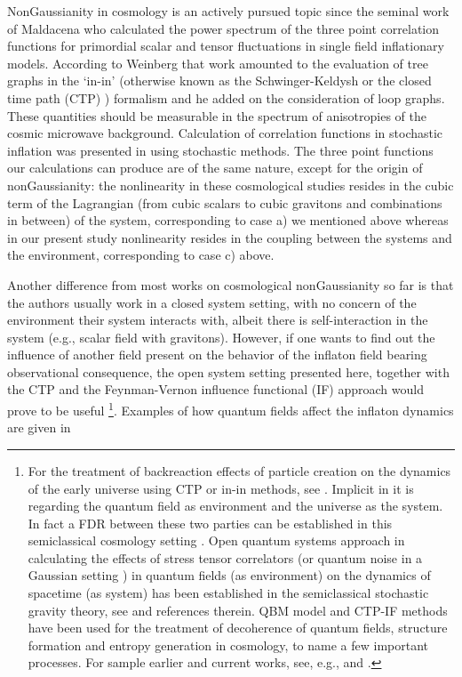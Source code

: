 \documentclass[%
amssymb,preprint,preprintnumbers,nofootinbib,superscriptaddress]{revtex4}
\begin{document}
NonGaussianity in cosmology is an actively pursued topic since the seminal work of Maldacena \cite{Maldacena} who calculated the power spectrum of the three point correlation functions for primordial scalar and tensor fluctuations in single field inflationary models.  According to Weinberg \cite{Weinberg} that work amounted to the evaluation of tree graphs in the `in-in' (otherwise known as the Schwinger-Keldysh   or the closed time path (CTP) \cite{ctp}) formalism and he added on the consideration of loop graphs. These quantities should be  measurable in the spectrum of anisotropies of the cosmic microwave background. Calculation of correlation functions in stochastic inflation was presented in \cite{VenSta} using stochastic methods.  The three point functions our calculations can produce are of the same nature, except for the origin of nonGaussianity: the nonlinearity in these cosmological studies resides in the cubic term of the Lagrangian (from cubic scalars to cubic gravitons and combinations in between) of the system, corresponding to case a) we mentioned above whereas in our present study nonlinearity resides in the coupling between the systems and the environment, corresponding to case c) above.


Another difference from most works on   cosmological nonGaussianity so far is that the authors usually work in a closed system setting, with no concern of the environment their system interacts with, albeit there is self-interaction in the system (e.g., scalar field with gravitons). However, if one wants to find out the influence of another field present on the behavior of the inflaton field bearing observational consequence, the open system setting presented here, together with the CTP and the Feynman-Vernon influence functional (IF) \cite{if} approach would prove to be useful \footnote{For the treatment of backreaction effects of particle creation on the dynamics of the early universe using CTP or in-in methods, see \cite{CalHu87}. Implicit in it is regarding the quantum field as environment and the universe as the system. In fact a FDR between these two parties can be established in this semiclassical cosmology setting \cite{HuSin}. Open quantum systems approach in calculating the effects of stress tensor correlators (or quantum noise in a Gaussian setting \cite{if}) in quantum fields (as environment) on the dynamics of spacetime (as system) has been established in the  semiclassical stochastic gravity theory, see \cite{HuVerBook} and references therein.  QBM model and CTP-IF methods have been used for the treatment of decoherence of quantum fields, structure formation and entropy generation in cosmology, to name a few important processes.  For sample earlier and current works, see, e.g.,  \cite{HPZdec,LomMaz,RouVer} and \cite{HHentropy,Colas}.}.   %
Examples of how quantum fields affect the inflaton dynamics are given in \cite{WNLLC07,LNWW11,ChoNg20}
\end{document}
